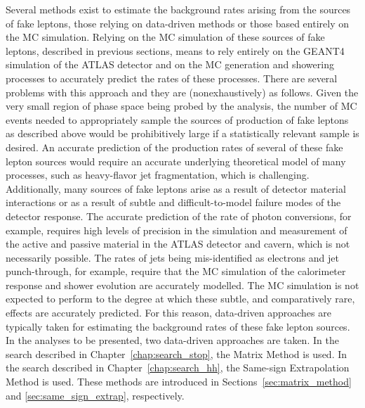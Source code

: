 Several methods exist to estimate the background rates arising from the sources of fake
leptons, those relying on data-driven methods or those based entirely on the MC
simulation.
Relying on the MC simulation of these sources of fake leptons, described in previous
sections, means to rely entirely on the \textsc{GEANT4} simulation of the ATLAS detector
and on the MC generation and showering processes to accurately predict the
rates of these processes.
There are several problems with this approach and they are (nonexhaustively) as follows.
Given the very small region of phase space being probed by the analysis,
the number of MC events needed to appropriately sample the sources of production of fake
leptons as described above would be prohibitively large if a statistically relevant sample
is desired.
An accurate prediction of the production rates of several of these fake lepton sources
would require an accurate underlying theoretical model of many processes, such as
heavy-flavor jet fragmentation, which is challenging.
Additionally, many sources of fake leptons arise as a result of detector material interactions
or as a result of subtle and difficult-to-model failure modes of the detector response.
The accurate prediction of the rate of photon conversions, for example, requires
high levels of precision in the simulation and measurement of the active and passive material in the ATLAS detector and cavern,
which is not necessarily possible.
The rates of jets being mis-identified as electrons and jet punch-through, for example,
require that the MC simulation of the calorimeter response and shower evolution are
accurately modelled.
The MC simulation is not expected to perform to the degree at which these subtle, and comparatively rare, effects
are accurately predicted.
For this reason, data-driven approaches are typically taken for estimating the background rates
of these fake lepton sources.
In the analyses to be presented, two data-driven approaches are taken.
In the search described in Chapter~\ref{chap:search_stop}, the Matrix Method
is used.
In the search described in Chapter~\ref{chap:search_hh}, the Same-sign Extrapolation
Method is used.
These methods are introduced in Sections~\ref{sec:matrix_method} and \ref{sec:same_sign_extrap}, respectively.


\FloatBarrier
%
%

